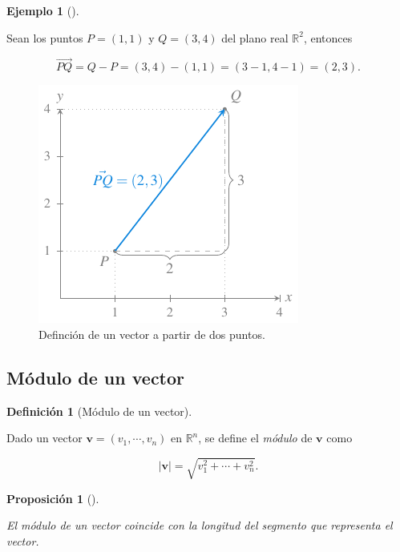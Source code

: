 \documentclass[
  a4paper,
]{scrreport}
\theoremstyle{definition}
\newtheorem{example}{Ejemplo}[chapter]
\theoremstyle{plain}
\theoremstyle{definition}
\newtheorem{definition}{Definición}[chapter]
\theoremstyle{definition}
\theoremstyle{plain}
\theoremstyle{plain}
\newtheorem{proposition}{Proposición}[chapter]
\theoremstyle{remark}
\begin{document}
\begin{example}[]\protect\hypertarget{exm-vector-dos-puntos}{}\label{exm-vector-dos-puntos}

Sean los puntos \(P=(1,1)\) y \(Q=(3,4)\) del plano real
\(\mathbb{R}^2\), entonces

\[\vec{PQ} = Q-P = (3,4)-(1,1) = (3-1,4-1) = (2,3).\]

\begin{figure}[H]

{\centering \includegraphics{img/geometria-plano-espacio/vector-puntos.pdf}

}

\caption{Definción de un vector a partir de dos puntos.}

\end{figure}%

\end{example}

\subsection{Módulo de un vector}\label{muxf3dulo-de-un-vector}

\begin{definition}[Módulo de un
vector]\protect\hypertarget{def-modulo-vector}{}\label{def-modulo-vector}

Dado un vector \(\mathbf{v}=(v_1,\cdots,v_n)\) en \(\mathbb{R}^n\), se
define el \emph{módulo} de \(\mathbf{v}\) como

\[
\lvert \mathbf{v} \rvert = \sqrt{v_1^2+ \cdots + v_n^2}.
\]

\end{definition}

\begin{proposition}[]\protect\hypertarget{prp-modulo-vector}{}\label{prp-modulo-vector}

El módulo de un vector coincide con la longitud del segmento que
representa el vector.

\end{proposition}
\end{document}
